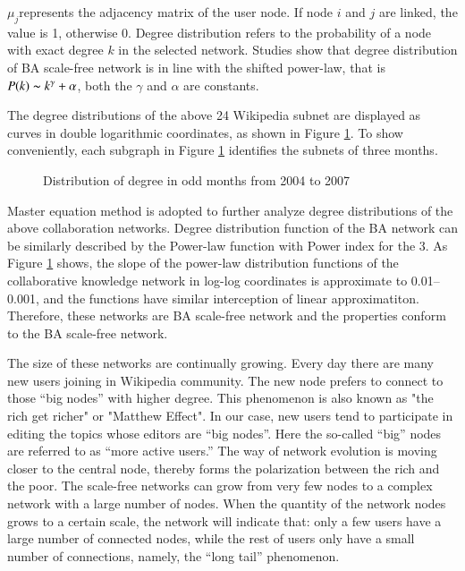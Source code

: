 \documentclass{elsarticle}
\begin{document}
$\mu_j$represents the adjacency matrix of the user node. If node $i$
and $j$ are linked, the value  is 1, otherwise 0. Degree distribution
refers to the probability of a node with exact degree $k$ in the
selected network. Studies show that degree distribution of BA
scale-free network is in line with the shifted power-law, that is
$P(k)\thicksim k^\gamma+\alpha$, both the $\gamma$ and $\alpha$ are 
constants. 


The degree distributions of the above 24 Wikipedia subnet are
displayed as curves in double logarithmic coordinates, as shown in
Figure \ref{fig:degree-distr}. To show conveniently, each subgraph in Figure \ref{fig:degree-distr} identifies
the subnets of three months.
\begin{figure}[htpb]
 
  \centering
  \subfigure[ ]{
     \scalebox{0.18}{\texttt{[image: 02-1]}}
   } \quad
  \subfigure[ ]{ 
       \scalebox{0.18}{\texttt{[image: 02-2]}}
   } 
   
    \subfigure[ ]{
     \scalebox{0.18}{\texttt{[image: 02-3]}}
   } \quad
  \subfigure[ ]{ 
       \scalebox{0.18}{\texttt{[image: 02-4]}}
   } 
  
    \subfigure[ ]{
     \scalebox{0.18}{\texttt{[image: 02-5]}}
   } \quad
  \subfigure[ ]{ 
       \scalebox{0.18}{\texttt{[image: 02-6]}}
   } 

    \subfigure[ ]{
     \scalebox{0.18}{\texttt{[image: 02-7]}}
   } \quad
  \subfigure[ ]{ 
       \scalebox{0.18}{\texttt{[image: 02-8]}}
   } 
   \caption{Distribution of degree in odd months from 2004 to 2007}
    \label{fig:degree-distr}
\end{figure}

Master equation method is adopted to further analyze degree
distributions of the above collaboration networks\cite{PhysRevLett.85.4633}. Degree
distribution function of the BA network can be similarly described by
the Power-law function with Power index for the 3. As Figure \ref{fig:degree-distr} shows,
the slope of the power-law distribution functions of the 
collaborative knowledge network in log-log coordinates is approximate
to 0.01--0.001, and the functions have similar interception of 
linear approximatiton. Therefore, these networks are  BA scale-free network and the properties  conform to the
BA scale-free network.

The size of these networks are continually growing. Every day there
are many new users joining in Wikipedia
community.  
The new node prefers to connect to those
“big nodes” with higher degree. This phenomenon is also known as "the
rich get richer" or "Matthew Effect". In our case, new users tend to participate in editing
the topics whose editors are “big nodes”. Here
the so-called “big” nodes are referred to as “more active users.” The way of network evolution
is moving closer to the central node, thereby forms the polarization
between the rich and the poor. The scale-free networks can grow from
very few nodes to a complex network with a large number of nodes.  When the
quantity of the network nodes grows to a certain scale, the network
will indicate that: only a few users have a large number of connected
nodes, while the rest of  users only have a small number of
connections, namely, the “long tail” phenomenon. 
\end{document}
